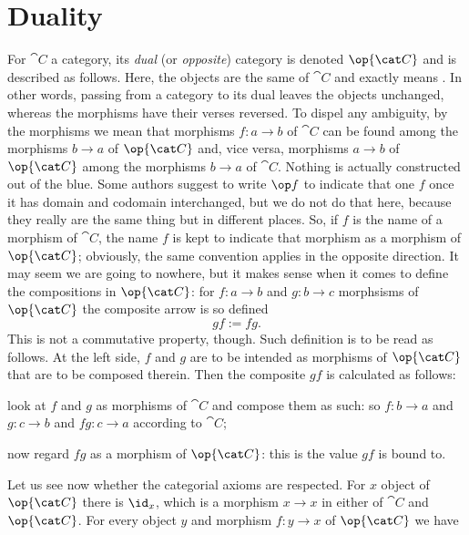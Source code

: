 
\section{Duality}

For \(\cat C\) a category, its {\em dual} (or {\em opposite}) category is denoted \(\op{\cat C}\) and is described as follows. Here, the objects are the same of \(\cat C\) and  exactly means . In other words, passing from a category to its dual leaves the objects unchanged, whereas the morphisms have their verses reversed. To dispel any ambiguity, by  the morphisms we mean that morphisms \(f : a \to b\) of \(\cat C\) can be found among the morphisms \(b \to a\) of \(\op{\cat C}\) and, vice versa, morphisms \(a \to b\) of \(\op{\cat C}\) among the morphisms \(b \to a\) of \(\cat C\). Nothing is actually constructed out of the blue. Some authors suggest to write \(\op f\) to indicate that one \(f\) once it has domain and codomain interchanged, but we do not do that here, because they really are the same thing but in different places. So, if \(f\) is the name of a morphism of \(\cat C\), the name \(f\) is kept to indicate that morphism as a morphism of \(\op{\cat C}\); obviously, the same convention applies in the opposite direction. It may seem we are going to nowhere, but it makes sense when it comes to define the compositions in \(\op{\cat C}\): for \(f : a \to b\) and \(g : b \to c\) morphsisms of \(\op{\cat C}\) the composite arrow is so defined
\[gf := fg .\label{defeqn:DualComp}\]
This is not a commutative property, though. Such definition is to be read as follows. At the left side, \(f\) and \(g\) are to be intended as morphisms of \(\op{\cat C}\) that are to be composed therein. Then the composite \(gf\) is calculated as follows:
\begin{tcbenum}
\item look at \(f\) and \(g\) as morphisms of \(\cat C\) and compose them as such: so \(f : b \to a\) and \(g : c \to b\) and \(fg : c \to a\) according to \(\cat C\);
\item now regard \(fg\) as a morphism of \(\op{\cat C}\): this is the value \(gf\) is bound to.
\end{tcbenum}
Let us see now whether the categorial axioms are respected. For \(x\) object of \(\op {\cat C}\) there is \(\id_x\), which is a morphism \(x \to x\) in either of \(\cat C\) and \(\op{\cat C}\). For every object \(y\) and morphism \(f : y \to x\) of \(\op{\cat C}\) we have
